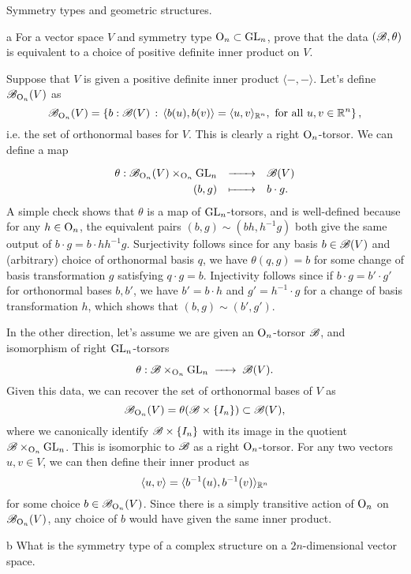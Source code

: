 \documentclass{../../templates/lkx_pset}
\begin{document}
\begin{problem}{6}
Symmetry types and geometric structures.
\end{problem}

\begin{parts}
	\begin{part}{a}
		For a vector space $V$ and symmetry type $\operatorname{O}_n\subset \operatorname{GL}_n$, prove that the data $(\mathscr{B}, \theta)$ is equivalent to a choice of positive definite inner product on $V$.
	\end{part}

	Suppose that $V$ is given a positive definite inner product $\langle -, -\rangle$. Let's define $\mathscr{B}_{\operatorname{O}_n}(V)$ as
	\[
		\mathscr{B}_{\operatorname{O}_n}(V) = \left\{ b : \mathscr{B}(V) \,:\, \langle b(u), b(v)\rangle = \langle u, v\rangle_{\mathbb{R}^n}, \textrm{ for all } u,v\in \mathbb{R}^n\right\},
	\]
	i.e. the set of orthonormal bases for $V$. This is clearly a right $\operatorname{O}_n$-torsor. We can define a map
	\[
		\definefunction{\theta}{\scB_{\O_n}(V)\times_{\O_n} \GL_n}{\scB(V)}{(b,g)}{b\cdot g.}
	\]
	A simple check shows that $\theta$ is a map of $\operatorname{GL}_n$-torsors, and is well-defined because for any $h\in \operatorname{O}_n$, the equivalent pairs $(b,g) \sim (bh, h^{-1}g)$ both give the same output of $b\cdot g = b\cdot hh^{-1}g$. Surjectivity follows since for any basis $b\in \mathscr{B}(V)$ and (arbitrary) choice of orthonormal basis $q$, we have $\theta(q, g)=b$ for some change of basis transformation $g$ satisfying $q\cdot g = b$. Injectivity follows since if $b\cdot g = b'\cdot g'$ for orthonormal bases $b,b'$, we have $b'=b\cdot h$ and $g'=h^{-1}\cdot g$ for a change of basis transformation $h$, which shows that $(b,g)\sim (b',g')$.

	In the other direction, let's assume we are given an $\operatorname{O}_n$-torsor $\mathscr{B}$, and isomorphism of right $\operatorname{GL}_n$-torsors
	\[
		\theta : \scB \times_{\O_n} \GL_n \longto \scB(V).
	\]
	Given this data, we can recover the set of orthonormal bases of $V$ as
	\[
		\mathscr{B}_{\operatorname{O}_n}(V) = \theta( \mathscr{B} \times \{I_n\}) \subset \mathscr{B}(V),
	\]
	where we canonically identify $\mathscr{B}\times \{I_n\}$ with its image in the quotient $\mathscr{B} \times_{\operatorname{O}_n} \operatorname{GL}_n$. This is isomorphic to $\mathscr{B}$ as a right $\operatorname{O}_n$-torsor. For any two vectors $u,v\in V$, we can then define their inner product as
	\[
		\langle u, v\rangle = \langle b^{-1}(u), b^{-1}(v) \rangle_{\mathbb{R}^n}
	\]
	for some choice $b\in \mathscr{B}_{\operatorname{O}_n}(V)$. Since there is a simply transitive action of $\operatorname{O}_n$ on $\mathscr{B}_{\operatorname{O}_n}(V)$, any choice of $b$ would have given the same inner product.

	\begin{part}{b}
		What is the symmetry type of a complex structure on a $2n$-dimensional vector space.
	\end{part}


\end{parts}
\end{document}
